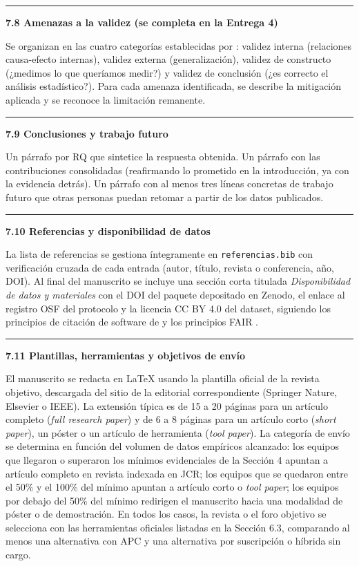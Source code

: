 \documentclass[11pt,a4paper]{article}
\newcounter{secc}
\newcommand{\submark}[1]{\par\vspace{4pt}\noindent
    {\color{uteqgreen}\rule[-1pt]{3.5pt}{12pt}}\hspace{6pt}\textbf{\color{uteqgreen}#1}\par\vspace{2pt}}
\begin{document}
\submark{7.8 Amenazas a la validez (se completa en la Entrega 4)}
Se organizan en las cuatro categorías establecidas por \cite{wohlin2012experimentation}: validez interna (relaciones causa-efecto internas), validez externa (generalización), validez de constructo (¿medimos lo que queríamos medir?) y validez de conclusión (¿es correcto el análisis estadístico?).
Para cada amenaza identificada, se describe la mitigación aplicada y se reconoce la limitación remanente.

\submark{7.9 Conclusiones y trabajo futuro}
Un párrafo por RQ que sintetice la respuesta obtenida.
Un párrafo con las contribuciones consolidadas (reafirmando lo prometido en la introducción, ya con la evidencia detrás).
Un párrafo con al menos tres líneas concretas de trabajo futuro que otras personas puedan retomar a partir de los datos publicados.

\submark{7.10 Referencias y disponibilidad de datos}
La lista de referencias se gestiona íntegramente en \texttt{referencias.bib} con verificación cruzada de cada entrada (autor, título, revista o conferencia, año, DOI).
Al final del manuscrito se incluye una sección corta titulada \emph{Disponibilidad de datos y materiales} con el DOI del paquete depositado en Zenodo, el enlace al registro OSF del protocolo y la licencia CC BY 4.0 del dataset, siguiendo los principios de citación de software de \cite{smith2016force11} y los principios FAIR \cite{wilkinson2016fair}.

\submark{7.11 Plantillas, herramientas y objetivos de envío}
El manuscrito se redacta en LaTeX usando la plantilla oficial de la revista objetivo, descargada del sitio de la editorial correspondiente (Springer Nature, Elsevier o IEEE).
La extensión típica es de 15 a 20 páginas para un artículo completo (\emph{full research paper}) y de 6 a 8 páginas para un artículo corto (\emph{short paper}), un póster o un artículo de herramienta (\emph{tool paper}).
La categoría de envío se determina en función del volumen de datos empíricos alcanzado: los equipos que llegaron o superaron los mínimos evidenciales de la Sección 4 apuntan a artículo completo en revista indexada en JCR; los equipos que se quedaron entre el 50\% y el 100\% del mínimo apuntan a artículo corto o \emph{tool paper}; los equipos por debajo del 50\% del mínimo redirigen el manuscrito hacia una modalidad de póster o de demostración.
En todos los casos, la revista o el foro objetivo se selecciona con las herramientas oficiales listadas en la Sección 6.3, comparando al menos una alternativa con APC y una alternativa por suscripción o híbrida sin cargo.
\end{document}
